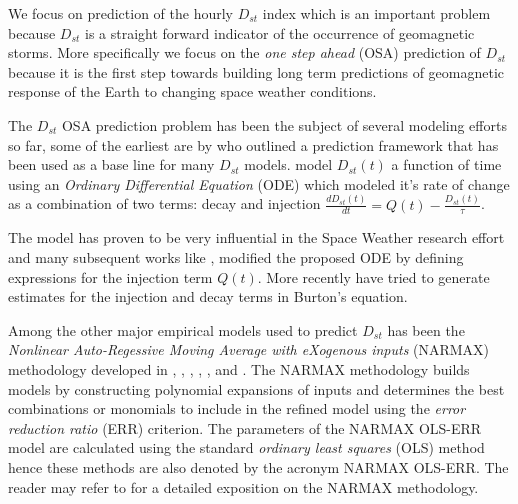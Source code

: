 \documentclass[referee,a4paper,12pt,traditabstract]{swsc}
\begin{document}
\begin{linenumbers}

We focus on prediction of the hourly $D_{st}$ index which is an important problem because $D_{st}$ is a straight forward indicator of the occurrence of geomagnetic storms. More specifically we focus on the \emph{one step ahead} (OSA) prediction of $D_{st}$ because it is the first step towards building long term predictions of geomagnetic response of the Earth to changing space weather conditions. 

The $D_{st}$ OSA prediction problem has been the subject of several modeling efforts so far, some of the earliest are by \citet{JGR:JGR10260} who outlined a prediction framework that has been used as a base line for many $D_{st}$ models. \citet{JGR:JGR10260} model $D_{st}(t)$ a function of time using an \emph{Ordinary Differential Equation} (ODE) which modeled it's rate of change as a combination of two terms: decay and injection $\frac{d D_{st}(t)}{dt} = Q(t) - \frac{D_{st}(t)}{\tau}$. 

The \citet{JGR:JGR10260} model has proven to be very influential in the Space Weather research effort and many subsequent works like \citet{Wang:Dst}, \citet{JGRA:JGRA14856} modified the proposed ODE by defining expressions for the injection term $Q(t)$. More recently \citet{Ballatore2014} have tried to generate estimates for the injection and decay terms in Burton's equation.

Among the other major empirical models used to predict $D_{st}$ has been the \emph{Nonlinear Auto-Regessive Moving Average with eXogenous inputs} (NARMAX) methodology developed in \citet{doi:10.1080/00207178908559767}, \citet{GRL:GRL13494}, \citet{GRL:GRL20944}, \citet{JGRA:JGRA18657}, \citet{JGRA:JGRA20661}, \citet{JGRA:JGRA50192} and \citet{balikhin:narmax}. The NARMAX methodology builds models by constructing polynomial expansions of inputs and determines the best combinations or monomials to include in the refined model using the \emph{error reduction ratio} (ERR) criterion. The parameters of the NARMAX OLS-ERR model are calculated using the standard \emph{ordinary least squares} (OLS) method hence these methods are also denoted by the acronym NARMAX OLS-ERR. The reader may refer to \citet{billings2013nonlinear} for a detailed exposition on the NARMAX methodology.


\end{linenumbers}
\end{document}

